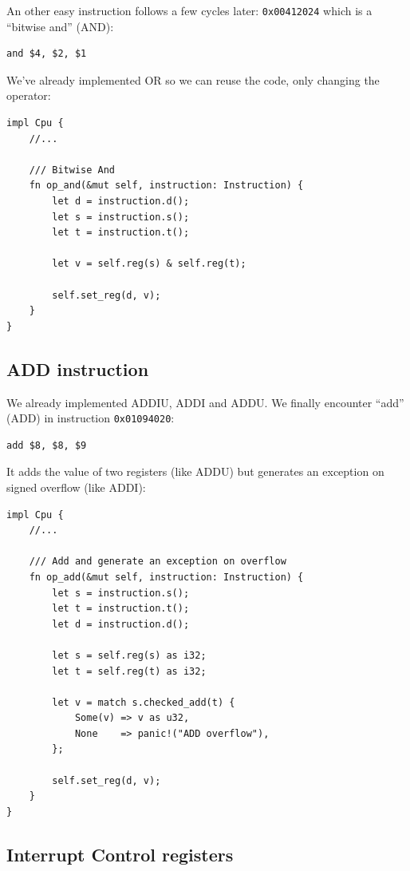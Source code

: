\documentclass[a4paper]{article}
\newcommand{\code}[1] {\texttt{#1}}
\begin{document}
An other easy instruction follows a few cycles later:
\code{0x00412024} which is a ``bitwise and'' (AND):

\begin{lstlisting}[language=assembly]
and $4, $2, $1
\end{lstlisting}

We've already implemented OR so we can reuse the code, only changing
the operator:

\begin{lstlisting}
impl Cpu {
    //...

    /// Bitwise And
    fn op_and(&mut self, instruction: Instruction) {
        let d = instruction.d();
        let s = instruction.s();
        let t = instruction.t();

        let v = self.reg(s) & self.reg(t);

        self.set_reg(d, v);
    }
}
\end{lstlisting}

\subsection{ADD instruction}

We already implemented ADDIU, ADDI and ADDU. We finally encounter
``add'' (ADD) in instruction \code{0x01094020}:

\begin{lstlisting}[language=assembly]
add $8, $8, $9
\end{lstlisting}

It adds the value of two registers (like ADDU) but generates an
exception on signed overflow (like ADDI):

\begin{lstlisting}
impl Cpu {
    //...

    /// Add and generate an exception on overflow
    fn op_add(&mut self, instruction: Instruction) {
        let s = instruction.s();
        let t = instruction.t();
        let d = instruction.d();

        let s = self.reg(s) as i32;
        let t = self.reg(t) as i32;

        let v = match s.checked_add(t) {
            Some(v) => v as u32,
            None    => panic!("ADD overflow"),
        };

        self.set_reg(d, v);
    }
}
\end{lstlisting}

\subsection{Interrupt Control registers}
\end{document}
